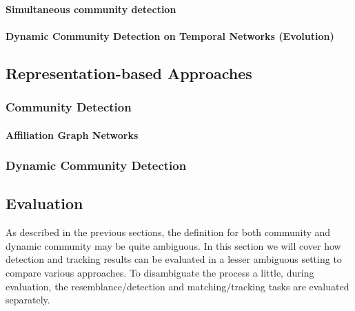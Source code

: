 \documentclass[
acmsmall,
nonacm,
screen,
acmthm]{../../scripts/pandoc/templates/acmart}
\begin{document}
\hypertarget{simultaneous-community-detection}{%
\paragraph{Simultaneous community
detection}\label{simultaneous-community-detection}}

\hypertarget{dynamic-community-detection-on-temporal-networks-evolution}{%
\paragraph{Dynamic Community Detection on Temporal Networks
(Evolution)}\label{dynamic-community-detection-on-temporal-networks-evolution}}

\hypertarget{representation-based-approaches}{%
\subsection{Representation-based
Approaches}\label{representation-based-approaches}}

\hypertarget{community-detection-2}{%
\subsubsection{Community Detection}\label{community-detection-2}}

\hypertarget{affiliation-graph-networks}{%
\paragraph{Affiliation Graph
Networks}\label{affiliation-graph-networks}}

\hypertarget{dynamic-community-detection-1}{%
\subsubsection{Dynamic Community
Detection}\label{dynamic-community-detection-1}}

\hypertarget{evaluation}{%
\subsection{Evaluation}\label{evaluation}}

As described in the previous sections, the definition for both community
and dynamic community may be quite ambiguous. In this section we will
cover how detection and tracking results can be evaluated in a lesser
ambiguous setting to compare various approaches. To disambiguate the
process a little, during evaluation, the resemblance/detection and
matching/tracking tasks are evaluated separately.
\end{document}
